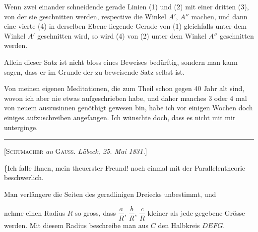 

%
Wenn zwei einander schneidende gerade Linien (1) und (2) mit einer dritten (3), von der sie geschnitten werden, respective die Winkel $A'$, $A''$ machen, und dann eine vierte (4) in derselben Ebene liegende Gerade von (1) gleichfalls unter dem Winkel $A'$ geschnitten wird, so wird (4) von (2) unter dem Winkel $A''$ geschnitten werden.

Allein dieser Satz ist nicht bloss eines Beweises bedürftig, sondern man kann sagen, dass er im Grunde der zu beweisende Satz selbst ist.

Von meinen eigenen Meditationen, die zum Theil schon gegen 40 Jahr alt sind, wovon ich aber nie etwas aufgeschrieben habe, und daher manches 3 oder 4 mal von neuem auszusinnen genöthigt gewesen bin, habe ich vor einigen Wochen doch einiges aufzuschreiben angefangen. Ich wünschte doch, dass es nicht mit mir unterginge.

\bigskip
\hrule
\bigskip

\begin{center}
[\textsc{Schumacher} \emph{an} \textsc{Gauss}. \emph{Lübeck, 25. Mai 1831.}]
\end{center}

\{Ich falle Ihnen, mein theuerster Freund! noch einmal mit der Parallelentheorie beschwerlich.

Man verlängere die Seiten des geradlinigen Dreiecks unbestimmt, und

\begin{center}

\end{center}

\noindent nehme einen Radius $R$ so gross, dass $\dfrac{a}{R}$, $\dfrac{b}{R}$, $\dfrac{c}{R}$ kleiner als jede gegebene Grösse werden. Mit diesem Radius beschreibe man aus $C$ den Halbkreis $DEFG$.
